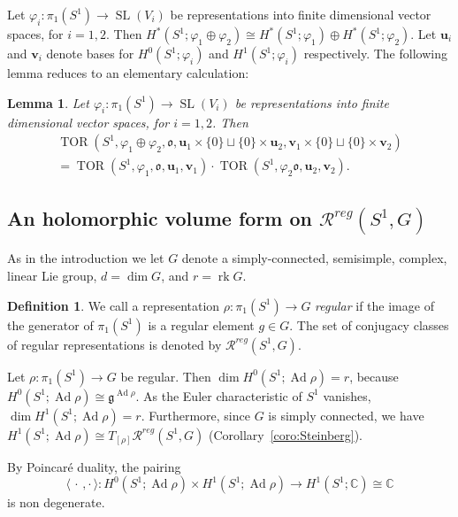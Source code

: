 \documentclass[11pt]{article}
\newtheorem{lemm}[theo]{Lemma}
\theoremstyle{definition}
\newtheorem{defi}[theo]{Definition}
\numberwithin{equation}{section}
\numberwithin{figure}{section}
\numberwithin{table}{section}
\DeclareMathOperator{\SL}{SL}
\DeclareMathOperator{\TOR}{TOR}
\DeclareMathOperator{\Ad}{Ad}
\DeclareMathOperator{\rk}{rk}
\newcommand{\Rcal}{\mathcal{R}}
\newcommand{\Cbb}{\mathbb{C}}
\newcommand{\gfrk}{\mathfrak{g}}
\newcommand{\ofrk}{\mathfrak{o}}
\newcommand{\ubf}{\mathbf{u}}
\newcommand{\vbf}{\mathbf{v}}
\begin{document}
Let $\varphi_i\colon\pi_1(S^1)\to\SL(V_i)$ be representations into finite dimensional vector spaces, for $i=1,2$. Then $H^*(S^1;\varphi_1\oplus\varphi_2)\cong H^*(S^1;\varphi_1)\oplus H^*(S^1;\varphi_2)$. Let $\ubf_i$ and $\vbf_i$ denote bases for $H^0(S^1;\varphi_i)$ and $H^1(S^1;\varphi_i)$ respectively. The following lemma reduces to an elementary calculation:

\begin{lemm}\label{lem:TOR_mult}
Let $\varphi_i\colon\pi_1(S^1)\to\SL(V_i)$ be representations into finite dimensional vector spaces, for $i=1,2$. Then
\begin{multline*}
\TOR(S^1,\varphi_1\oplus\varphi_2,\ofrk,\ubf_1\times\{0\}\sqcup\{0\}\times\ubf_2,\vbf_1\times\{0\}\sqcup\{0\}\times\vbf_2)
\\ =\TOR(S^1,\varphi_1,\ofrk,\ubf_1,\vbf_1) \cdot
\TOR(S^1,\varphi_2\ofrk,\ubf_2,\vbf_2).
\end{multline*}
\end{lemm}



\subsection{An holomorphic volume form on \texorpdfstring{$\Rcal^{reg}(S^1,G)$}{Rreg(S1,G)}}\label{sec:peripheral}

As in the introduction we let $G$ denote a simply-connected, semisimple, complex, linear Lie group, $d = \dim G$, and $r =\rk G$.

\begin{defi}\label{def:regular_rep}
We call a representation $\rho\colon\pi_1(S^1)\to G$ \emph{regular} if the image of the generator of $\pi_1(S^1)$ is a regular element ${g}\in G$. The set of conjugacy classes of regular representations is denoted by $\Rcal^{reg}(S^1,G)$.
\end{defi}

Let $\rho\colon\pi_1(S^1)\to G$ be regular. Then $\dim H^0(S^1;\Ad\rho)=r$, because $H^0(S^1;\Ad\rho)\cong\gfrk^{\Ad \rho}$. As the Euler characteristic of $S^1$ vanishes, $\dim H^1(S^1;\Ad\rho)=r $. Furthermore, since $G$ is simply connected, we have $H^1(S^1;\Ad\rho)\cong T_{[\rho]} \Rcal^{reg}(S^1,G)$ (Corollary~\ref{coro:Steinberg}).

By Poincaré duality, the pairing
\[
\langle \,\cdot\,,\cdot\, \rangle \colon H^0(S^1;\Ad\rho)\times H^1(S^1;\Ad\rho) \to H^1(S^1;\Cbb)\cong \Cbb
\]
is non degenerate.
\end{document}
